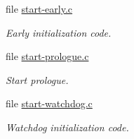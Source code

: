\begin{DoxyCompactItemize}
file \mbox{\hyperlink{start-early_8c}{start-\/early.\+c}}
\begin{DoxyCompactList}\small\item\em Early initialization code. \end{DoxyCompactList}\item 
file \mbox{\hyperlink{start-prologue_8c}{start-\/prologue.\+c}}
\begin{DoxyCompactList}\small\item\em Start prologue. \end{DoxyCompactList}\item 
file \mbox{\hyperlink{start-watchdog_8c}{start-\/watchdog.\+c}}
\begin{DoxyCompactList}\small\item\em Watchdog initialization code. \end{DoxyCompactList}\end{DoxyCompactItemize}

